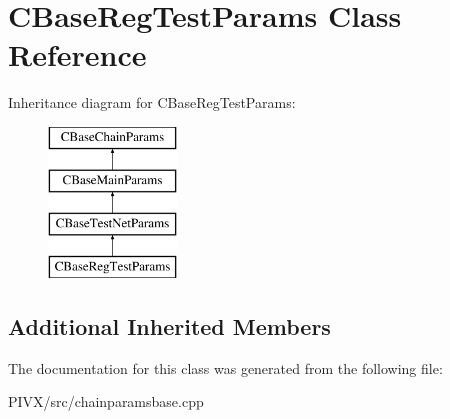 \hypertarget{class_c_base_reg_test_params}{}\section{C\+Base\+Reg\+Test\+Params Class Reference}
\label{class_c_base_reg_test_params}
Inheritance diagram for C\+Base\+Reg\+Test\+Params\+:\begin{figure}[H]
\begin{center}
\leavevmode
\includegraphics[height=4.000000cm]{class_c_base_reg_test_params}
\end{center}
\end{figure}
\subsection*{Additional Inherited Members}


The documentation for this class was generated from the following file\+:\begin{DoxyCompactItemize}
\item 
P\+I\+V\+X/src/chainparamsbase.\+cpp\end{DoxyCompactItemize}
